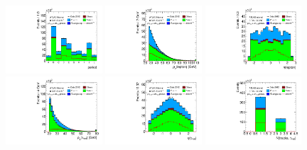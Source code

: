 \clearpage

\begin{figure}[tp]
  \centering
  \includegraphics[width=0.32\textwidth]{figures/presel/period}
  \includegraphics[width=0.32\textwidth]{figures/presel/lep-pt-hi}
  \includegraphics[width=0.32\textwidth]{figures/presel/lep-eta} \\
  \includegraphics[width=0.32\textwidth]{figures/presel/tau-pt}
  \includegraphics[width=0.32\textwidth]{figures/presel/tau-eta}
  \includegraphics[width=0.32\textwidth]{figures/presel/tau-numTrack} \\

\end{figure}

